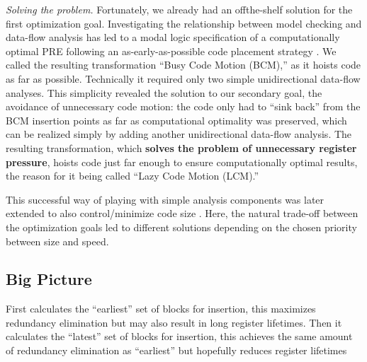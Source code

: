 \textit{Solving the problem.} Fortunately, we already had an offthe-shelf solution for the first optimization goal. Investigating the relationship between model checking and data-flow
analysis has led to a modal logic specification of a computationally optimal PRE following an as-early-as-possible code
placement strategy \cite{steffen1991data}. We called the resulting transformation “Busy Code Motion (BCM),” as it hoists code as
far as possible. Technically it required only two simple unidirectional data-flow analyses. This simplicity revealed the
solution to our secondary goal, the avoidance of unnecessary code motion: the code only had to “sink back” from
the BCM insertion points as far as computational optimality was preserved, which can be realized simply by adding another 
unidirectional data-flow analysis. The resulting transformation, which \textbf{solves the problem of unnecessary register
pressure}, hoists code just far enough to ensure computationally optimal results, the reason for it being called “Lazy
Code Motion (LCM).”

This successful way of playing with simple analysis components was later extended to also control/minimize code
size \cite{ruthing2000sparse}. Here, the natural trade-off between the optimization goals led to different solutions depending on the chosen
priority between size and speed.


\subsection{Big Picture}

First calculates the “earliest” set of blocks for insertion, this maximizes redundancy elimination but may also result in long register lifetimes.
Then it calculates the “latest” set of blocks for insertion, this achieves the same amount of redundancy elimination as “earliest” but hopefully reduces register lifetimes


\subsection{}





